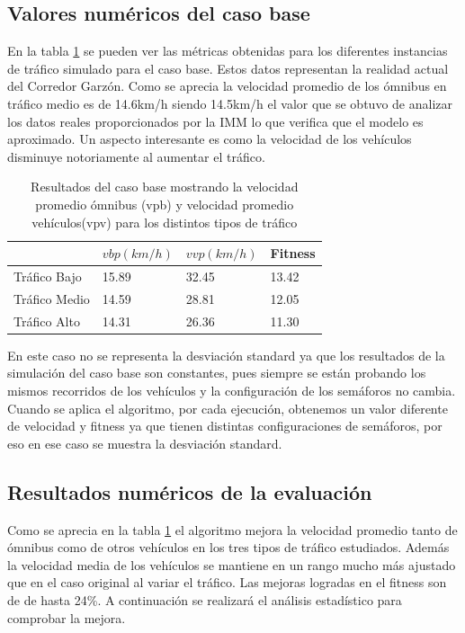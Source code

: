 \subsection{Valores numéricos del caso base}

En la tabla \ref{table:resultado_caso_base} se pueden ver las métricas obtenidas para los diferentes instancias de tráfico simulado para el caso base. Estos datos representan la realidad actual del Corredor Garzón. Como se aprecia la velocidad promedio de los ómnibus en tráfico medio es de 14.6km/h siendo 14.5km/h el valor que se obtuvo de analizar los datos reales proporcionados por la IMM lo que verifica que el modelo es aproximado. Un aspecto interesante es como la velocidad de los vehículos disminuye notoriamente al aumentar el tráfico.
 
 \begin{table}[H]
 	\renewcommand{\arraystretch}{1.2}
 	\caption{Resultados del caso base mostrando la velocidad promedio ómnibus (vpb) y velocidad promedio vehículos(vpv) para los distintos tipos de tráfico}
 	\label{table:resultado_caso_base}
 	\centering
 	\begin{tabular}{p{2.5cm}p{2.5cm}p{2.5cm}p{2cm} }
 		\hline
 		&
 		$vbp(km/h)$& 
 		$vvp(km/h)$ & 
 		Fitness \\ 
 		\hline
 		Tráfico Bajo & 15.89  & 32.45& 13.42\\
 		Tráfico Medio & 14.59  & 28.81& 12.05\\
 		Tráfico Alto & 14.31  & 26.36& 11.30\\

 		\hline
 	\end{tabular}
 \end{table}
 
 En este caso no se representa la desviación standard ya que los resultados de la simulación del caso base son constantes, pues siempre se están probando los mismos recorridos de los vehículos y la configuración de los semáforos no cambia. Cuando se aplica el algoritmo, por cada ejecución, obtenemos un valor diferente de velocidad y fitness ya que tienen distintas configuraciones de semáforos, por eso en ese caso se muestra la desviación standard.


\subsection{Resultados numéricos de la evaluación }

Como se aprecia en la tabla \ref{table:resultado_caso_base} el algoritmo mejora la velocidad promedio tanto de ómnibus como de otros vehículos en los tres tipos de tráfico estudiados. Además la velocidad media de los vehículos se mantiene en un rango mucho más ajustado que en el caso original al variar el tráfico. Las mejoras logradas en el fitness son de de hasta 24\%. A continuación se realizará el análisis estadístico para comprobar la mejora.


